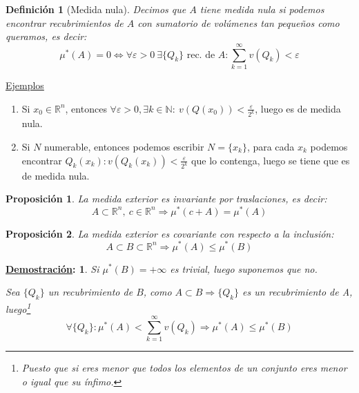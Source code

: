 \documentclass[10pt,a4paper,openright]{book}
\theoremstyle{break}
\newtheorem*{defi}{Definición}
\newtheorem*{prop}{Proposición}
\newtheorem*{demo}{\underline{Demostración}:}
\begin{document}
\begin{defi}[Medida nula]
Decimos que $A$ tiene medida nula si podemos encontrar recubrimientos de $A$ con sumatorio de volúmenes tan pequeños como queramos, es decir:
$$\mu^{*}\left( A \right) = 0 \Leftrightarrow \forall \varepsilon > 0 \ \exists \{Q_k\} \text{ rec. de } A: \sum_{k=1}^{\infty} v\left( Q_k \right) < \varepsilon $$  
\end{defi}

\underline{Ejemplos}
	\begin{enumerate}
       \item Si $x_0 \in \mathbb{R}^{n}$, entonces $\forall \varepsilon > 0, \exists k \in \mathbb N: \ v\left( Q\left( x_0 \right)  \right) < \frac{\varepsilon}{2^{k}}$, luego es de medida nula.
       \item Si $N$ numerable, entonces podemos escribir $N = \{x_k\}$, para cada $x_k$ podemos encontrar $Q_k\left( x_k \right): v\left( Q_k\left( x_k \right)  \right) < \frac{\varepsilon}{2^{k}}$ que lo contenga, luego se tiene que es de medida nula.
    \end{enumerate}
    
\begin{prop}
La medida exterior es invariante por traslaciones, es decir:
$$A \subset \mathbb{R}^{n}, \ c \in \mathbb{R}^{n} \Rightarrow \mu^{*}\left( c + A \right) = \mu^{*}\left( A \right) $$ 
\end{prop}

\begin{prop}
La medida exterior es covariante con respecto a la inclusión:
$$A \subset B \subset \mathbb{R}^{n} \Rightarrow \mu^{*}\left( A \right) \le \mu^{*}\left( B \right) $$
\end{prop}
\begin{demo}
Si $\mu^{*}\left( B \right) = +\infty$ es trivial, luego suponemos que no.

Sea $\{Q_k\}$ un recubrimiento de $B$, como $A \subset B \Rightarrow \{Q_k\}$ es un recubrimiento de A, luego\footnote{Puesto que si eres menor que todos los elementos de un conjunto eres menor o igual que su ínfimo.}
$$\forall \{Q_k\}: \mu^{*}\left( A \right) < \sum_{k=1}^{\infty} v\left( Q_k \right) \Rightarrow \mu^{*}\left( A \right) \le \mu^{*}\left( B \right) $$
\end{demo}
\end{document}
